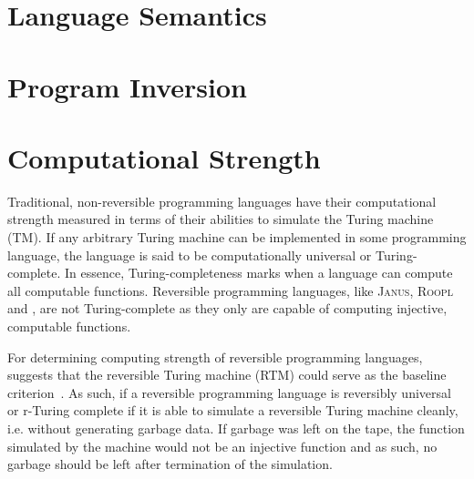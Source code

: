 \section{Language Semantics}
\label{sec:language-semantics}

\section{Program Inversion}
\label{sec:program-inversion}




\section{Computational Strength}
\label{sec:computational-strength}
Traditional, non-reversible programming languages have their computational strength measured in terms of their abilities to simulate the Turing machine (TM). If any arbitrary Turing machine can be implemented in some programming language, the language is said to be computationally universal or Turing-complete. In essence, Turing-completeness marks when a language can compute all computable functions. Reversible programming languages, like \textsc{Janus}, \textsc{Roopl} and \rooplpp, are not Turing-complete as they only are capable of computing injective, computable functions.

For determining computing strength of reversible programming languages,~\citeauthor{ty:ejanus} suggests that the reversible Turing machine (RTM) could serve as the baseline criterion~\cite{ty:ejanus}. As such, if a reversible programming language is reversibly universal or r-Turing complete if it is able to simulate a reversible Turing machine cleanly, i.e. without generating garbage data. If garbage was left on the tape, the function simulated by the machine would not be an injective function and as such, no garbage should be left after termination of the simulation.

